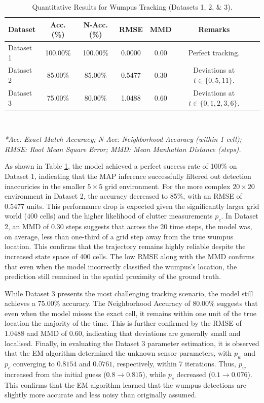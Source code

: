 \documentclass[10pt]{article}
\begin{document}
\begin{table}[htbp]
    \centering
    \caption{Quantitative Results for Wumpus Tracking (Datasets 1, 2, \& 3).}
    \label{tab:performance_results}
    \begin{tabular}{lcccccl}
        \hline
        \textbf{Dataset} & \textbf{Acc. (\%)} & \textbf{N-Acc. (\%)} & \textbf{RMSE} & \textbf{MMD} & \textbf{Remarks} \\ \hline
        Dataset 1        & 100.00\% & 100.00\% & 0.0000 & 0.00 & Perfect tracking. \\
        Dataset 2        & 85.00\%  & 85.00\%  & 0.5477 & 0.30 & Deviations at $t \in \{0, 5, 11\}$. \\
        Dataset 3        & 75.00\%  & 80.00\%  & 1.0488 & 0.60 & Deviations at $t \in \{0, 1, 2, 3, 6\}$. \\ \hline
    \end{tabular}
    \\[10pt]
    \raggedright
    \footnotesize{\textit{*Acc: Exact Match Accuracy; N-Acc: Neighborhood Accuracy (within 1 cell); \\ 
    RMSE: Root Mean Square Error; MMD: Mean Manhattan Distance (steps).}}
\end{table}

As shown in Table \ref{tab:performance_results}, the model achieved a perfect success rate of 100\% on Dataset 1, indicating that the MAP inference successfully 
filtered out detection inaccuricies in the smaller $5 \times 5$ grid environment. For the more complex $20 \times 20$ environment in Dataset 2, the accuracy decreased to 85\%, 
with an RMSE of 0.5477 units. This performance drop is expected given the significantly larger grid world ($400$ cells) and the higher likelihood of clutter measurements
$p_c$. In Dataset 2, an MMD of 0.30 steps suggests that across the 20 time steps, the model was, on average, less than one-third of a grid step away from the true wumpus location. 
This confirms that the trajectory remains highly reliable despite the increased state space of 400 cells. The low RMSE along with the MMD confirms that even when the model incorrectly classified the 
wumpus's location, the prediction still remained in the spatial proximity of the ground truth.

While Dataset 3 presents the most challenging tracking scenario, the model still achieves a 75.00\% accuracy. The Neighborhood Accuracy of 80.00\% suggests that 
even when the model misses the exact cell, it remains within one unit of the true location the majority of the time. This 
is further confirmed by the RMSE of 1.0488 and MMD of 0.60, indicating that deviations are generally small and localised.
Finally, in evaluating the Dataset 3 parameter estimation, it is observed that the 
EM algorithm determined the unknown sensor parameters, with $p_w$ and $p_c$ converging to $0.8154$ and $0.0761$, respectively, within 7 iterations. 
Thus, $p_w$ increased from the initial guess ($0.8 \rightarrow 0.815$), while $p_c$ decreased ($0.1 \rightarrow 0.076$). 
This confirms that the EM algorithm learned that the wumpus detections are slightly more accurate and less noisy than originally assumed.

{
\footnotesize
 
}
\end{document}

